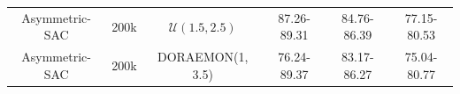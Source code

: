 \begin{table}
{\begin{tabular}{cccccc}
\rowcolor[HTML]{FFFFFF} 
{\color[HTML]{000000} Asymmetric-SAC}     & {\color[HTML]{000000} 200k}                     & {\color[HTML]{000000} \( \mathcal{U}(1.5, 2.5) \)} & {\color[HTML]{000000} 87.26-89.31}                                                                            & {\color[HTML]{000000} 84.76-86.39}                                                                         & {\color[HTML]{000000} 77.15-80.53}                                                                          \\
\rowcolor[HTML]{EFEFEF} 
{\color[HTML]{000000} Asymmetric-SAC}     & {\color[HTML]{000000} 200k}                     & {\color[HTML]{000000} DORAEMON(1, 3.5)}            & {\color[HTML]{000000} 76.24-89.37}                                                                            & {\color[HTML]{000000} 83.17-86.27}                                                                         & {\color[HTML]{000000} 75.04-80.77}                                                                         
\end{tabular}%
}
\end{table}


